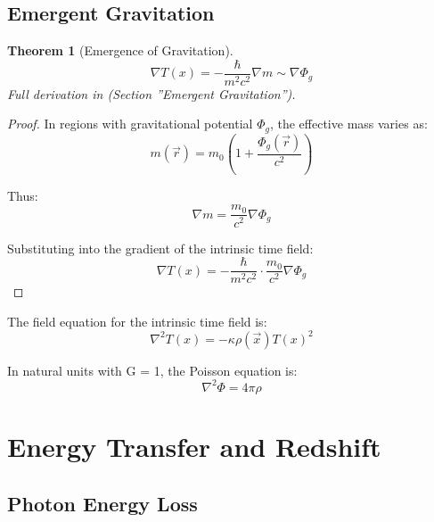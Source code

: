 \documentclass[a4paper,12pt]{article}
\newtheorem{theorem}{Theorem}[section]
\theoremstyle{definition}
\theoremstyle{remark}
\newcommand{\Tfield}{T(x)}
\newcommand{\vecx}{\vec{x}}
\begin{document}
	\subsection{Emergent Gravitation}
	
	\begin{theorem}[Emergence of Gravitation]
		\begin{equation}
			\nabla \Tfield = -\frac{\hbar}{m^2 c^2} \nabla m \sim \nabla \Phi_g
		\end{equation}
		Full derivation in \cite{pascher_galaxies_2025} (Section ''Emergent Gravitation'').
	\end{theorem}
	
	\begin{proof}
		In regions with gravitational potential \(\Phi_g\), the effective mass varies as:
		\begin{equation}
			m(\vec{r}) = m_0 \left(1 + \frac{\Phi_g(\vec{r})}{c^2}\right)
		\end{equation}
		
		Thus:
		\begin{equation}
			\nabla m = \frac{m_0}{c^2} \nabla \Phi_g
		\end{equation}
		
		Substituting into the gradient of the intrinsic time field:
		\begin{equation}
			\nabla \Tfield = -\frac{\hbar}{m^2 c^2} \cdot \frac{m_0}{c^2} \nabla \Phi_g
		\end{equation}
	\end{proof}
	
	The field equation for the intrinsic time field is:
	\begin{equation}
		\nabla^2 \Tfield = -\kappa \rho(\vecx) \Tfield^2
	\end{equation}
	
	In natural units with G = 1, the Poisson equation is:
	\begin{equation}
		\nabla^2 \Phi = 4\pi \rho
	\end{equation}
	
	\section{Energy Transfer and Redshift}
	
	\subsection{Photon Energy Loss}
	
\end{document}
